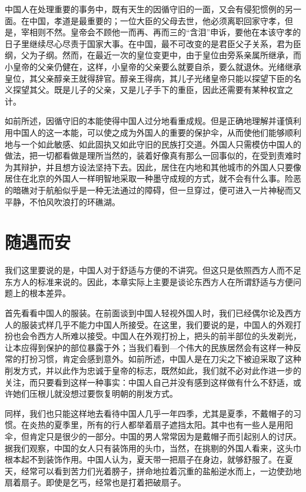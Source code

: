 \documentclass[12pt,oneside]{book}
\begin{document}
\begin{common-format}
中国人在处理重要的事务中，既有天生的因循守旧的一面，又会有侵犯惯例的另一面。在中国，孝道是最重要的；一位大臣的父母去世，他必须离职回家守孝，但是，宰相则不然。皇帝会不顾他一而再、再而三的“含泪”申诉，要他在本该守孝的日子里继续尽心尽责于国家大事。在中国，最不可改变的是君臣父子关系，君为臣纲，父为子纲。然而，在最近一次的皇位变更中，由于皇位由旁系亲属所继承，而小皇帝的父亲仍健在，这样，小皇帝的父亲要么就要自杀，要么就退休。光绪继承皇位，其父亲醇亲王就得辞官。醇亲王得病，其儿子光绪皇帝只能以探望下臣的名义探望其父。既是儿子的父亲，又是儿子手下的重臣，因此还需要有某种权宜之计。 

如前所述，因循守旧的本能使得中国人过分地看重成规。但是正确地理解并谨慎利用中国人的这一本能，可以使之成为外国人的重要的保护伞，从而使他们能够顺利地与一个如此敏感、如此固执又如此守旧的民族打交道。外国人只需模仿中国人的做法，把一切都看做是理所当然的，装着好像真有那么一回事似的，在受到责难时为其辩护，并且想方设法坚持下去。因此，居住在内地和其他城市的外国人只要像居住在北京的外国人一样明智地采取一种墨守成规的方式，就不会有什么事。险恶的暗礁对于航船似乎是一种无法通过的障碍，但一旦穿过，便可进入一片神秘而又平静，不怕风吹浪打的环礁湖。


\chapter{随遇而安}
我们这里要说的是，中国人对于舒适与方便的不讲究。但这只是依照西方人而不足东方人的标准来说的。因此，本章实际上主要是谈论东西方人在所谓舒适与方便问题上的根本差异。 

首先看看中国人的服装。在前面谈到中国人轻视外国人时，我们已经偶尔论及西方人的服装式样几乎不能力中国人所接受。在这里，我们要说的是，中国人的外观打扮也会令西方人所难以接受。中国人在外观打扮上，把头的前半部位的头发剃光，让本应得到保护的部位暴露于外；当我们看到—个伟大的民族居然会有这样一种反常的打扮习惯，肯定会感到意外。如前所述，中国人是在刀尖之下被迫采取了这种削发方式，并以此作为忠诚于皇帝的标志，既然如此，我们就不必对此作进一步的关注，而只要看到这样一种事实：中国人自己并没有感到这样做有什么不舒适，或许她们压根儿就没想过要恢复明朝的削发方式。 

同样，我们也只能这样地去看待中国人几乎一年四季，尤其是夏季，不戴帽子的习惯。在炎热的夏季里，所有的行人都举着扇子遮挡太阳。其中也有一些人是用阳伞，但肯定只是很少的一部分。中国的男人常常因为是戴帽子而引起别人的讨厌。据我们观察，中国的女人只有装饰用的头巾，当然，在挑剔的外国人看来，这头巾根本起不到装饰作用。中国人认为，夏天带一把扇子在身边，就够舒服了。在夏天，经常可以看到苦力们光着膀子，拼命地拉着沉重的盐船逆水而上，一边使劲地扇着扇子。即使是乞丐，经常也是打着把破扇子。 


\end{common-format}
\end{document}
